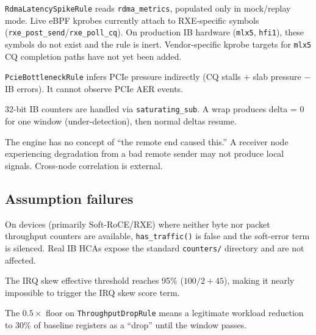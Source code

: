 \documentclass[11pt]{article}
\begin{document}
\begin{description}[style=nextline,leftmargin=0.5cm]
  \item[CQ latency via eBPF.]
    \texttt{RdmaLatencySpikeRule} reads \texttt{rdma\_metrics}, populated
    only in mock/replay mode. Live eBPF kprobes currently attach to
    RXE-specific symbols (\texttt{rxe\_post\_send}/\texttt{rxe\_poll\_cq}).
    On production IB hardware (\texttt{mlx5}, \texttt{hfi1}), these symbols
    do not exist and the rule is inert. Vendor-specific kprobe targets for
    \texttt{mlx5} CQ completion paths have not yet been added.
  \item[PCIe link-state changes.]
    \texttt{PcieBottleneckRule} infers PCIe pressure indirectly (CQ stalls
    + slab pressure $-$ IB errors). It cannot observe PCIe AER events.
  \item[Counter wraparound.]
    32-bit IB counters are handled via \texttt{saturating\_sub}. A wrap
    produces delta = 0 for one window (under-detection), then normal deltas
    resume.
  \item[Asymmetric faults.]
    The engine has no concept of ``the remote end caused this.'' A receiver
    node experiencing degradation from a bad remote sender may not produce
    local signals. Cross-node correlation is external.
\end{description}

\subsection{Assumption failures}

\begin{description}[style=nextline,leftmargin=0.5cm]
  \item[Devices with incomplete sysfs counters.]
    On devices (primarily Soft-RoCE/RXE) where neither byte nor packet
    throughput counters are available, \texttt{has\_traffic()} is false and
    the soft-error term is silenced. Real IB HCAs expose the standard
    \texttt{counters/} directory and are not affected.
  \item[2-CPU systems.]
    The IRQ skew effective threshold reaches 95\% ($100/2 + 45$), making
    it nearly impossible to trigger the IRQ skew score term.
  \item[Throughput floor.]
    The $0.5\times$ floor on \texttt{ThroughputDropRule} means a legitimate
    workload reduction to 30\% of baseline registers as a ``drop'' until the
    window passes.
\end{description}
\end{document}
